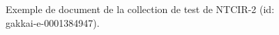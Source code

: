 \begin{figure}[ht]
{\begin{tabular}{|p{}|}

\end{tabular}
}
\caption{Exemple de document de la collection de test de NTCIR-2 (id: gakkai-e-0001384947).} %
\label{fig:example_prmn}
\end{figure}

